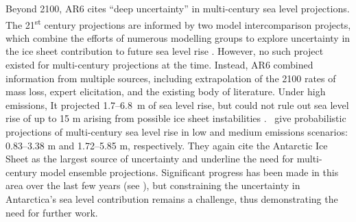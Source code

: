 Beyond 2100, AR6 cites ``deep uncertainty'' in multi-century sea level projections. The 21\textsuperscript{st} century projections are informed by two model intercomparison projects, which combine the efforts of numerous modelling groups to explore uncertainty in the ice sheet contribution to future sea level rise \citep{levermannProjectingAntarcticasContribution2020,payneFutureSeaLevel2021}. However, no such project existed for multi-century projections at the time. Instead, AR6 combined information from multiple sources, including extrapolation of the 2100 rates of mass loss, expert elicitation, and the existing body of literature. Under high emissions, It projected 1.7--6.8~m of sea level rise, but could not rule out sea level rise of up to 15 m arising from possible ice sheet instabilities \citep{decontoParisClimateAgreement2021}.~\cite{turnerMulticentennialProjectionsGlobal2023} give probabilistic projections of multi-century sea level rise in low and medium emissions scenarios: 0.83--3.38 m and 1.72--5.85 m, respectively. They again cite the Antarctic Ice Sheet as the largest source of uncertainty and underline the need for multi-century model ensemble projections. Significant progress has been made in this area over the last few years (see ), but constraining the uncertainty in Antarctica's sea level contribution remains a challenge, thus demonstrating the need for further work.


